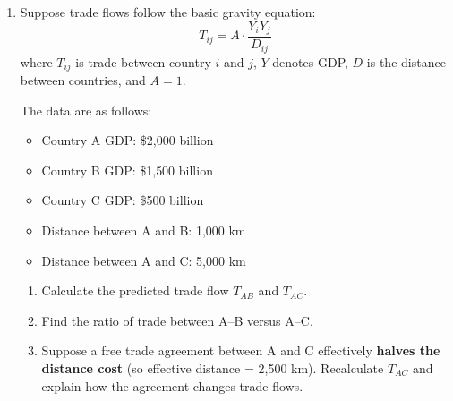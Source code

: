 \documentclass[12pt]{article}
\begin{document}
\begin{enumerate}

\item Suppose trade flows follow the basic gravity equation:
\[
T_{ij} = A \cdot \frac{Y_i Y_j}{D_{ij}}
\]
where $T_{ij}$ is trade between country $i$ and $j$, $Y$ denotes GDP, $D$ is the distance between countries, and $A=1$. 

\bigskip
The data are as follows:

\begin{itemize}
    \item Country A GDP: \$2{,}000 billion
    \item Country B GDP: \$1{,}500 billion
    \item Country C GDP: \$500 billion
    \item Distance between A and B: 1,000 km
    \item Distance between A and C: 5,000 km
\end{itemize}

\begin{enumerate}[label=(\alph*)]
    \item Calculate the predicted trade flow $T_{AB}$ and $T_{AC}$. 
    \item Find the ratio of trade between A--B versus A--C. 
    \item Suppose a free trade agreement between A and C effectively \textbf{halves the distance cost} (so effective distance = 2,500 km). Recalculate $T_{AC}$ and explain how the agreement changes trade flows. 
\end{enumerate}
\end{enumerate}
\end{document}
